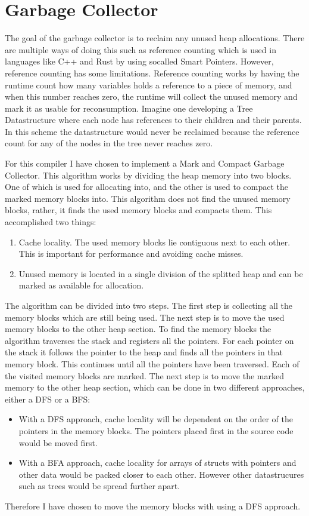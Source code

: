 \section*{Garbage Collector} 
The goal of the garbage collector is to reclaim any unused heap allocations. There are multiple ways of doing this such as reference counting which is used in languages like C++ and Rust by using socalled Smart Pointers. However, reference counting has some limitations. Reference counting works by having the runtime count how many variables holds a reference to a piece of memory, and when this number reaches zero, the runtime will collect the unused memory and mark it as usable for reconsumption. Imagine one developing a Tree Datastructure where each node has references to their children and their parents. In this scheme the datastructure would never be reclaimed because the reference count for any of the nodes in the tree never reaches zero. 

For this compiler I have chosen to implement a Mark and Compact Garbage Collector. This algorithm works by dividing the heap memory into two blocks. One of which is used for allocating into, and the other is used to compact the marked memory blocks into. This algorithm does not find the unused memory blocks, rather, it finds the used memory blocks and compacts them. This accomplished two things: 
\begin{enumerate}
    \item Cache locality. The used memory blocks lie contiguous next to each other. This is important for performance and avoiding cache misses.
    \item Unused memory is located in a single division of the splitted heap and can be marked as available for allocation. 
\end{enumerate}
The algorithm can be divided into two steps. The first step is collecting all the memory blocks which are still being used. The next step is to move the used memory blocks to the other heap section.
To find the memory blocks the algorithm traverses the stack and registers all the pointers. For each pointer on the stack it follows the pointer to the heap and finds all the pointers in that memory block. This continues until all the pointers have been traversed. Each of the visited memory blocks are marked. The next step is to move the marked memory to the other heap section, which can be done in two different approaches, either a DFS or a BFS:

\begin{itemize}
    \item With a DFS approach, cache locality will be dependent on the order of the pointers in the memory blocks. The pointers placed first in the source code would be moved first.
    \item With a BFA approach, cache locality for arrays of structs with pointers and other data would be packed closer to each other. However other datastrucures such as trees would be spread further apart.
\end{itemize}
Therefore I have chosen to move the memory blocks with using a DFS approach. 

